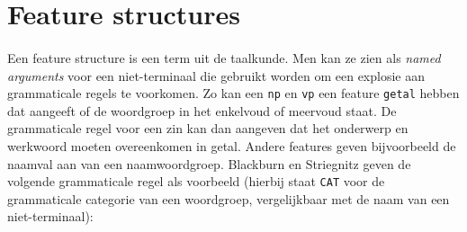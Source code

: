 


\section{Feature structures}
\label{sec:featureStructures}

\paragraph{} Een feature structure is een term uit de taalkunde. Men kan ze zien als \textit{named arguments} voor een niet-terminaal die gebruikt worden om een explosie aan grammaticale regels te voorkomen. Zo kan een \texttt{np} en \texttt{vp} een feature \texttt{getal} hebben dat aangeeft of de woordgroep in het enkelvoud of meervoud staat. De grammaticale regel voor een zin kan dan aangeven dat het onderwerp en werkwoord moeten overeenkomen in getal. Andere features geven bijvoorbeeld de naamval aan van een naamwoordgroep. Blackburn en Striegnitz \cite{NLPCourse} geven de volgende grammaticale regel als voorbeeld (hierbij staat \texttt{CAT} voor de grammaticale categorie van een woordgroep, vergelijkbaar met de naam van een niet-terminaal):

